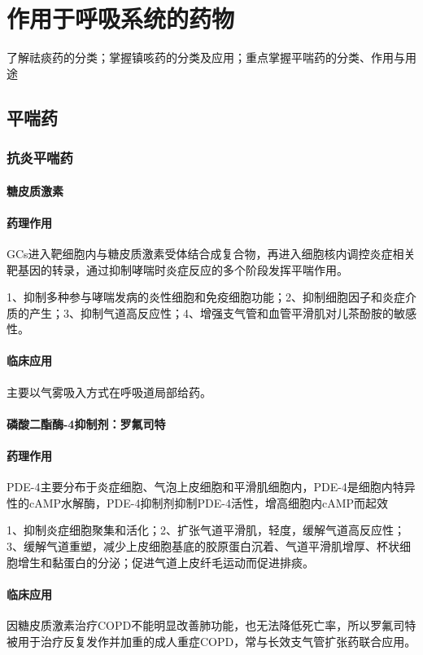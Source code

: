 \documentclass[UTF8]{ctexbook}
\begin{document}
\chapter{作用于呼吸系统的药物}
了解祛痰药的分类；掌握镇咳药的分类及应用；重点掌握平喘药的分类、作用与用途
\section{平喘药}

\subsection{抗炎平喘药}
\subsubsection{糖皮质激素}
\subsubsection{药理作用}
GCs进入靶细胞内与糖皮质激素受体结合成复合物，再进入细胞核内调控炎症相关靶基因的转录，通过抑制哮喘时炎症反应的多个阶段发挥平喘作用。

1、抑制多种参与哮喘发病的炎性细胞和免疫细胞功能；2、抑制细胞因子和炎症介质的产生；3、抑制气道高反应性；4、增强支气管和血管平滑肌对儿茶酚胺的敏感性。
\subsubsection{临床应用}主要以气雾吸入方式在呼吸道局部给药。

\subsubsection{磷酸二酯酶-4抑制剂：罗氟司特}
\subsubsection{药理作用}PDE-4主要分布于炎症细胞、气泡上皮细胞和平滑肌细胞内，PDE-4是细胞内特异性的cAMP水解酶，PDE-4抑制剂抑制PDE-4活性，增高细胞内cAMP而起效

1、抑制炎症细胞聚集和活化；2、扩张气道平滑肌，轻度，缓解气道高反应性；3、缓解气道重塑，减少上皮细胞基底的胶原蛋白沉着、气道平滑肌增厚、杯状细胞增生和黏蛋白的分泌；促进气道上皮纤毛运动而促进排痰。
\subsubsection{临床应用}因糖皮质激素治疗COPD不能明显改善肺功能，也无法降低死亡率，所以罗氟司特被用于治疗反复发作并加重的成人重症COPD，常与长效支气管扩张药联合应用。
\end{document}
